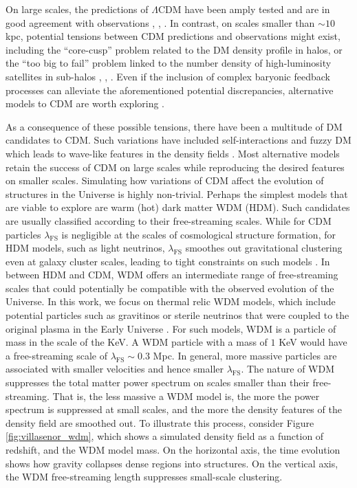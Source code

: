 On large scales, the predictions of $\Lambda$CDM have been amply tested and are in good agreement with observations \cite{Dalal2002}, \cite{VanWaerbeke2004}, \cite{Eisenstein2005}. In contrast, on scales smaller than $\sim 10$ kpc, potential tensions between CDM predictions and observations might exist, including the ``core-cusp'' problem related to the DM density profile in halos, or the ``too big to fail'' problem linked to the number density of high-luminosity satellites in sub-halos \cite{Moore1994}, \cite{Boylan_Kolchin_2011}, \cite{Weinberg_2015}. Even if the inclusion of complex baryonic feedback processes can alleviate the aforementioned potential discrepancies, alternative models to CDM are worth exploring \cite{Vogelsberger2014}.  

As a consequence of these possible tensions, there have been a multitude of DM candidates to CDM. Such variations have included self-interactions \cite{Spergel2000} and fuzzy DM which leads to wave-like features in the density fields \cite{Hu2000}. Most alternative models retain the success of CDM on large scales while reproducing the desired features on smaller scales. Simulating how variations of CDM affect the evolution of structures in the Universe is highly non-trivial. Perhaps the simplest models that are viable to explore are warm (hot) dark matter WDM (HDM). Such candidates are usually classified according to their free-streaming scales. While for CDM particles $\lambda_\mathrm{FS}$ is negligible at the scales of cosmological structure formation, for HDM models, such as light neutrinos, $\lambda_\mathrm{FS}$ smoothes out gravitational clustering even at galaxy cluster scales, leading to tight constraints on such models \cite{Hannestad_2004}. In between HDM and CDM, WDM offers an intermediate range of free-streaming scales that could potentially be compatible with the observed evolution of the Universe. In this work, we focus on thermal relic WDM models, which include potential particles such as gravitinos or sterile neutrinos that were coupled to the original plasma in the Early Universe \cite{Viel_2005}. For such models, WDM is a particle of mass in the scale of the KeV. A WDM particle with a mass of $1$ KeV would have a free-streaming scale of $\lambda_\mathrm{FS} \sim 0.3$ Mpc. In general, more massive particles are associated with smaller velocities and hence smaller $\lambda_\mathrm{FS}$. The nature of WDM suppresses the total matter power spectrum on scales smaller than their free-streaming. That is, the less massive a WDM model is, the more the power spectrum is suppressed at small scales, and the more the density features of the density field are smoothed out.
To illustrate this process, consider Figure \ref{fig:villasenor_wdm}, which shows a simulated density field as a function of redshift, and the WDM model mass. On the horizontal axis, the time evolution shows how gravity collapses dense regions into structures. On the vertical axis, the WDM free-streaming length suppresses small-scale clustering. 

